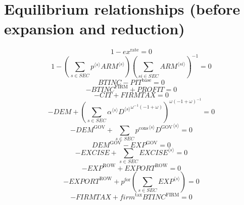 \section{Equilibrium relationships (before expansion and reduction)}

\begin{equation}
1 - {e\!x}^{\mathrm{rate}} = 0
\end{equation}
\begin{equation}
1 - \left(\sum_{s\in {S\!E\!C}} {{p}^{\langle s\rangle}} {{{A\!R\!M}}^{\langle s\rangle}}\right) \left(\sum_{{s\!i}\in {S\!E\!C}} {{A\!R\!M}}^{\langle {s\!i}\rangle}\right)^{-1} = 0
\end{equation}
\begin{equation}
{B\!T\!I\!N\!C} - {P\!I\!T}^{\mathrm{base}} = 0
\end{equation}
\begin{equation}
-{B\!T\!I\!N\!C}^{\mathrm{FIRM}} + {P\!R\!O\!F\!I\!T} = 0
\end{equation}
\begin{equation}
-{C\!I\!T} + {F\!I\!R\!M\!T\!A\!X} = 0
\end{equation}
\begin{equation}
-{D\!E\!M} + \left(\sum_{s\in {S\!E\!C}} {{\alpha}^{\langle s\rangle}} {{{D}^{\langle s\rangle}}^{{\omega}^{-1} \left(-1 + \omega\right)}}\right)^{{\omega} \left(-1 + \omega\right)^{-1}} = 0
\end{equation}
\begin{equation}
-{D\!E\!M}^{\mathrm{GOV}} + \sum_{s\in {S\!E\!C}} {{p^{\mathrm{cons}}}^{\langle s\rangle}} {{D^{\mathrm{GOV}}}^{\langle s\rangle}} = 0
\end{equation}
\begin{equation}
{D\!E\!M}^{\mathrm{GOV}} - {E\!X\!P}^{\mathrm{GOV}} = 0
\end{equation}
\begin{equation}
-{E\!X\!C\!I\!S\!E} + \sum_{s\in {S\!E\!C}} {{E\!X\!C\!I\!S\!E}}^{\langle s\rangle} = 0
\end{equation}
\begin{equation}
-{E\!X\!P}^{\mathrm{ROW}} + {E\!X\!P\!O\!R\!T}^{\mathrm{ROW}} = 0
\end{equation}
\begin{equation}
-{E\!X\!P\!O\!R\!T}^{\mathrm{ROW}} + {p^{\mathrm{for}}} \left(\sum_{s\in {S\!E\!C}} {{E\!X\!P}}^{\langle s\rangle}\right) = 0
\end{equation}
\begin{equation}
-{F\!I\!R\!M\!T\!A\!X} + {{f\!i\!r\!m}^{\mathrm{tax}}} {{B\!T\!I\!N\!C}^{\mathrm{FIRM}}} = 0
\end{equation}
